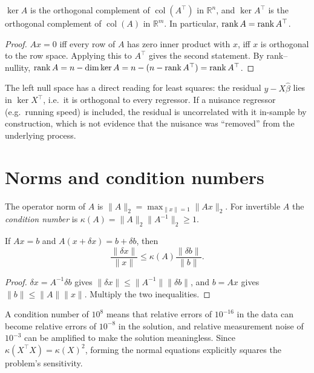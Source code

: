 \begin{theorem}
$\ker A$ is the orthogonal complement of $\operatorname{col}(A^\top)$ in $\mathbb R^n$, and $\ker A^\top$ is the orthogonal complement of $\operatorname{col}(A)$ in $\mathbb R^m$. In particular, $\operatorname{rank} A=\operatorname{rank} A^\top$.
\end{theorem}
\begin{proof}
$Ax=0$ iff every row of $A$ has zero inner product with $x$, iff $x$ is orthogonal to the row space. Applying this to $A^\top$ gives the second statement. By rank--nullity, $\operatorname{rank} A=n-\dim\ker A=n-(n-\operatorname{rank} A^\top)=\operatorname{rank} A^\top$.
\end{proof}
The left null space has a direct reading for least squares: the residual $y-X\hat\beta$ lies in $\ker X^\top$, i.e.\ it is orthogonal to every regressor. If a nuisance regressor (e.g.\ running speed) is included, the residual is uncorrelated with it in-sample by construction, which is not evidence that the nuisance was ``removed'' from the underlying process.

\section{Norms and condition numbers}
The operator norm of $A$ is $\|A\|_2=\max_{\|x\|=1}\|Ax\|_2$. For invertible $A$ the \emph{condition number} is $\kappa(A)=\|A\|_2\|A^{-1}\|_2\ge1$.

\begin{proposition}
If $Ax=b$ and $A(x+\delta x)=b+\delta b$, then
\[
\frac{\|\delta x\|}{\|x\|}\le\kappa(A)\frac{\|\delta b\|}{\|b\|}.
\]
\end{proposition}
\begin{proof}
$\delta x=A^{-1}\delta b$ gives $\|\delta x\|\le\|A^{-1}\|\|\delta b\|$, and $b=Ax$ gives $\|b\|\le\|A\|\|x\|$. Multiply the two inequalities.
\end{proof}
A condition number of $10^8$ means that relative errors of $10^{-16}$ in the data can become relative errors of $10^{-8}$ in the solution, and relative measurement noise of $10^{-3}$ can be amplified to make the solution meaningless. Since $\kappa(X^\top X)=\kappa(X)^2$, forming the normal equations explicitly squares the problem's sensitivity.

